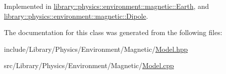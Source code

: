 Implemented in \hyperlink{classlibrary_1_1physics_1_1environment_1_1magnetic_1_1_earth_adc06e5eaa4df94dcad0709cc3abfa20d}{library\+::physics\+::environment\+::magnetic\+::\+Earth}, and \hyperlink{classlibrary_1_1physics_1_1environment_1_1magnetic_1_1_dipole_a7d58a3d6e2f5255f67c727a42f3a7a63}{library\+::physics\+::environment\+::magnetic\+::\+Dipole}.



The documentation for this class was generated from the following files\+:\begin{DoxyCompactItemize}
\item 
include/\+Library/\+Physics/\+Environment/\+Magnetic/\hyperlink{_magnetic_2_model_8hpp}{Model.\+hpp}\item 
src/\+Library/\+Physics/\+Environment/\+Magnetic/\hyperlink{_magnetic_2_model_8cpp}{Model.\+cpp}\end{DoxyCompactItemize}
